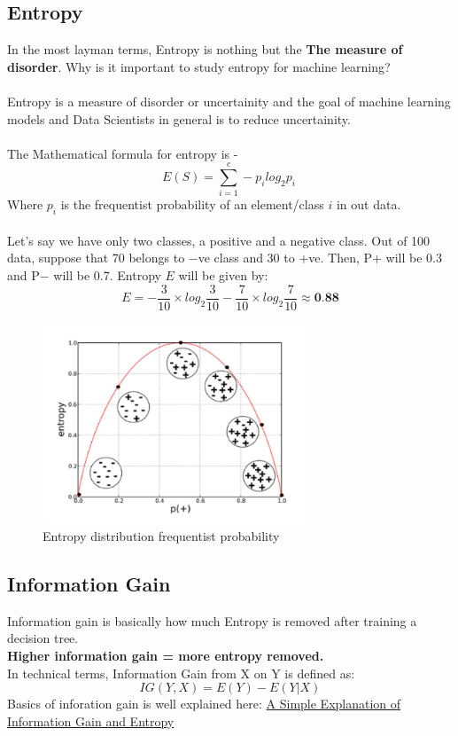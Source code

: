 \documentclass[12pt, A4]{report}
\begin{document}
\subsection*{Entropy}
	In the most layman terms, Entropy is nothing but the \textbf{The measure of disorder}.
	Why is it important to study entropy for machine learning? \\
	\\ Entropy is a measure of disorder or uncertainity and the goal of machine learning models and Data Scientists in general is to reduce uncertainity.\\
	\\ The Mathematical formula for entropy is - 
	\begin{equation}\label {eq:entropy}
		E(S) = \sum_{i=1}^c - p_i log_2 p_i\
	\end{equation}
	Where $p_i$ is the frequentist probability of an element/class $i$ in out data.\\
	\\ Let's say we have only two classes, a positive and a negative class. Out of 100 data, suppose that 70 belongs to $-$ve class and 30 to $+$ve. Then, P$+$ will be 0.3 and P$-$ will be 0.7.
	\vspace{4mm}
	Entropy $E$ will be given by:
	\begin{equation}
		E = -\frac{3}{10} \times log_2{\frac{3}{10}}-\frac{7}{10} \times log_2{\frac{7}{10}} \approx \textbf{0.88}
	\end{equation}
	\begin{figure}[h]
		\centering
		\includegraphics[width=8cm, height=6cm]{entropyDT.png}
		\caption{Entropy distribution frequentist probability}
	\end{figure}

\subsection*{Information Gain}
	Information gain is basically how much Entropy is removed after training a decision tree.\\
	\textbf{Higher information gain = more entropy removed.}\\
	In technical terms, Information Gain from X on Y is defined as:
	\begin{equation}\label{eq:inforamtion gain}
		IG(Y,X) = E(Y) - E(Y|X)
	\end{equation}
	Basics of inforation gain is well explained here: \href{https://victorzhou.com/blog/information-gain/}{A Simple Explanation of Information Gain and Entropy}
\end{document}
